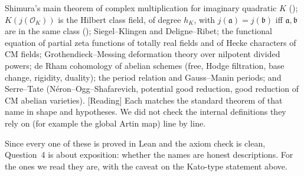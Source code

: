 \documentclass[11pt]{article}
\newcommand{\Reading}{\textcolor{readc}{\textsf{\small[Reading]}}}
\newcommand{\Oc}{\mathcal{O}}
\theoremstyle{plain}
\theoremstyle{definition}
\begin{document}
\begin{itemize}
  Shimura's main theorem of complex multiplication for imaginary quadratic $K$
  (); $K(j(\Oc_K))$ is the Hilbert class field, of degree $h_K$, with
  $j(\mathfrak a)=j(\mathfrak b)$ iff $\mathfrak a,\mathfrak b$ are in the same class
  (); Siegel--Klingen and Deligne--Ribet; the functional equation of partial
  zeta functions of totally real fields and of Hecke characters of CM fields; Grothendieck--Messing
  deformation theory over nilpotent divided powers; de Rham cohomology of abelian schemes (free, Hodge
  filtration, base change, rigidity, duality); the period relation and Gauss--Manin periods; and
  Serre--Tate (N\'eron--Ogg--Shafarevich, potential good reduction, good reduction of CM abelian
  varieties). \Reading{} Each matches the standard theorem of that name in shape and hypotheses. We
  did not check the internal definitions they rely on (for example the global Artin map) line by
  line.
\end{itemize}
\noindent Since every one of these is proved in Lean and the axiom check is clean, Question~4 is
about exposition: whether the names are honest descriptions. For the ones we read they are, with
the caveat on the Kato-type statement above.
\end{document}
